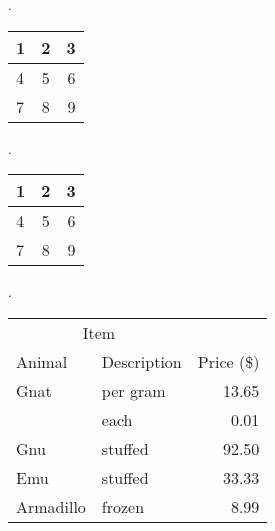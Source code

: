\documentclass{article}
\begin{document}
{
.\newline\newline\newline
}







\begin{tabular}{ l c r }
  \hline
  1 & 2 & 3 \\ \hline
  4 & 5 & \multicolumn{1}{r|}{6}  \\ \hline
  7 & 8 & 9 \\ \hline
\end{tabular}





{
.\newline\newline\newline
}







\begin{tabular}{ | l | c | r | }
  \hline
  1 & 2 & 3 \\ \hline
  4 & 5 & \multicolumn{1}{r}{6} \\ \hline
  7 & 8 & 9 \\ \hline
\end{tabular}





{
.\newline\newline\newline
}






\begin{tabular}{llr}
\hline
\multicolumn{2}{c}{Item} \\
\cline{1-2}
Animal    & Description & Price (\$) \\
\hline
Gnat      & per gram    & 13.65      \\
          & each        & 0.01       \\
Gnu       & stuffed     & 92.50      \\
Emu       & stuffed     & 33.33      \\
Armadillo & frozen      & 8.99       \\
\hline
\end{tabular}
\end{document}
